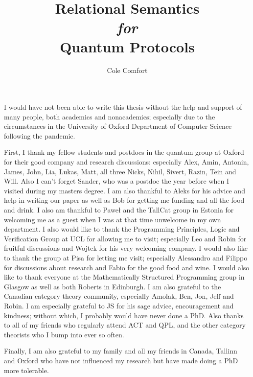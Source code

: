 \documentclass[12pt]{ociamthesis}  %
\title{Relational Semantics \\{ \it \Large for}\\ Quantum Protocols}
\author{Cole Comfort}
\begin{document}
\maketitle



\begin{acknowledgements}

I would have not been able to write this thesis without the help and support of many people, both academics and nonacademics;  especially due to the circumstances in the University of  Oxford Department of Computer Science following the pandemic.

First, I thank my fellow students and postdocs in the quantum group at  Oxford for their good company and research discussions: especially Alex,  Amin, Antonin, James, John, Lia, Lukas, Matt, all three Nicks, Nihil, Sivert, Razin, Tein and Will.  Also I can't forget Sander, who was a postdoc the year before when I visited during my masters degree.
I am also thankful to Aleks for his advice and help in writing our paper as well as Bob for getting me funding and all the  food and drink.
I also am thankful to Pawe\l{} and the TallCat group in Estonia for welcoming me as a guest when I was at that time unwelcome in my own department.  I also would like to thank the Programming Principles, Logic and Verification Group at UCL for allowing me to visit; especially Leo and Robin for fruitful discussions and Wojtek for his very welcoming company. I would also like to thank the group at Pisa for letting me visit; especially Alessandro and Filippo for discussions about research and Fabio for the good food and wine. I would also like to thank everyone at the Mathematically Structured Programming group in Glasgow as well as both Roberts in Edinburgh.
I am also grateful to the Canadian category theory community, especially Amolak, Ben, Jon, Jeff and Robin.  I am especially grateful to JS for his sage advice, encouragement and kindness; without which, I probably would have never done a PhD.  Also thanks to all of my friends who regularly attend ACT and QPL, and the other category theorists who I bump into ever so often.

Finally, I am also grateful to my family and all my friends in Canada, Tallinn and Oxford who have not influenced my research but have made doing a PhD more tolerable.

\end{acknowledgements}
\end{document}
